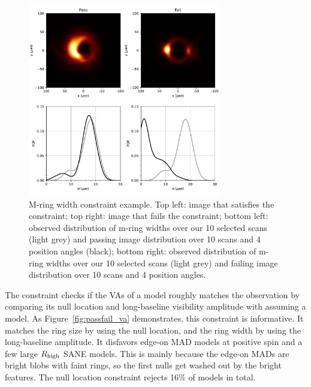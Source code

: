 \begin{figure}
  \centering
  \includegraphics[width=0.75\textwidth]{figures/mring_width_example.pdf}
  \caption{M-ring width constraint example.  Top left: image that satisfies the constraint; top right: image that fails the constraint; bottom left: observed distribution of m-ring widths over our 10 selected scans (light grey) and passing image distribution over 10 scans and 4 position angles (black); bottom right: observed distribution of m-ring widths over our 10 selected scans (light grey) and failing image distribution over 10 scans and 4 position angles.
  }
  \label{fig:mring_width_example}
\end{figure}



The \vam constraint checks if the VAs of a model roughly matches the
observation by comparing its null location and long-baseline visibility
amplitude with assuming a model.
As Figure~\ref{fig:passfail_va} demonstrates, this constraint is
informative.
It matches the ring size by using the null location, and the ring
width by using the long-baseline amplitude.
It disfavors edge-on MAD models at positive spin and a few large $R_\mathrm{high}$
SANE models.
This is mainly because the edge-on MADs are bright blobs with faint rings, so the first nulls get washed out by the bright features.
The null location constraint rejects 16\% of models in total.

